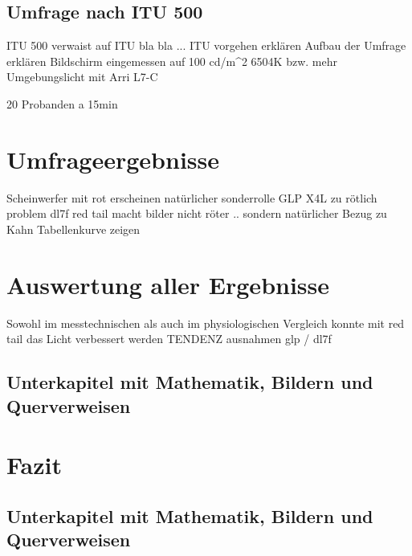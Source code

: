 \section{Umfrage nach ITU 500}
ITU 500 verwaist auf ITU bla bla ...
ITU vorgehen erklären
Aufbau der Umfrage erklären
Bildschirm eingemessen auf 100 cd/m^2 6504K bzw. mehr 
Umgebungslicht mit Arri L7-C

20 Probanden a 15min


\chapter{Umfrageergebnisse}

Scheinwerfer mit rot erscheinen natürlicher 
sonderrolle GLP X4L zu rötlich
problem dl7f
red tail macht bilder nicht röter .. sondern natürlicher
Bezug zu Kahn
Tabellenkurve zeigen


\chapter{Auswertung aller Ergebnisse}
Sowohl im messtechnischen als auch im physiologischen Vergleich konnte mit red tail das Licht verbessert werden TENDENZ
ausnahmen glp / dl7f



\section{Unterkapitel mit Mathematik, Bildern und Querverweisen}

\chapter{Fazit}

\section{Unterkapitel mit Mathematik, Bildern und Querverweisen}






\listoffigures %
\listoftables %


